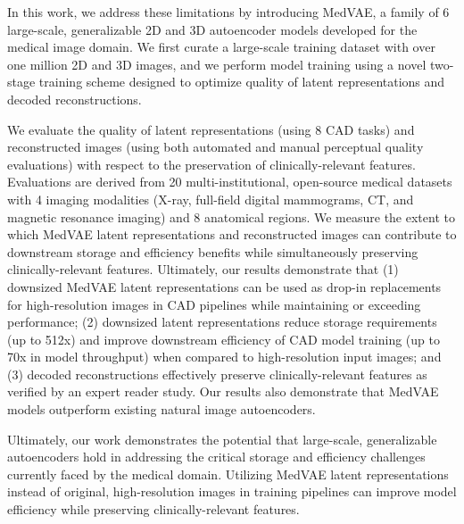 In this work, we address these limitations by introducing MedVAE, a family of 6 large-scale, generalizable 2D and 3D autoencoder models developed for the medical image domain. We first curate a large-scale training dataset with over one million 2D and 3D images, and we perform model training using a novel two-stage training scheme designed to optimize quality of latent representations and decoded reconstructions. 

We evaluate the quality of latent representations (using 8 CAD tasks) and reconstructed images (using both automated and manual perceptual quality evaluations) with respect to the preservation of clinically-relevant features. Evaluations are derived from 20 multi-institutional, open-source medical datasets with 4 imaging modalities  (X-ray, full-field digital mammograms, CT, and magnetic resonance imaging) and 8 anatomical regions. We measure the extent to which MedVAE latent representations and reconstructed images can contribute to downstream storage and efficiency benefits while simultaneously preserving clinically-relevant features. Ultimately, our results demonstrate that (1) downsized MedVAE latent representations can be used as drop-in replacements for high-resolution images in CAD pipelines while maintaining or exceeding performance; (2) downsized latent representations reduce storage requirements (up to 512x) and improve downstream efficiency of CAD model training (up to 70x in model throughput) when compared to high-resolution input images; and (3) decoded reconstructions effectively preserve clinically-relevant features as verified by an expert reader study. Our results also demonstrate that MedVAE models outperform existing natural image autoencoders. 

Ultimately, our work demonstrates the potential that large-scale, generalizable autoencoders hold in addressing the critical storage and efficiency challenges currently faced by the medical domain. Utilizing MedVAE latent representations instead of original, high-resolution images in training pipelines can improve model efficiency while preserving clinically-relevant features.
